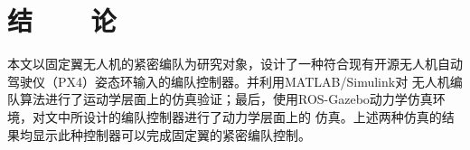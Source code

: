 %
%
%
%
%
%

\chapter*{\vskip 10bp\textmd{结~~~~论} \vskip -6bp}


本文以固定翼无人机的紧密编队为研究对象，设计了一种符合现有开源无人机自动驾驶仪（PX4）姿态环输入的编队控制器。并利用MATLAB/Simulink对
无人机编队算法进行了运动学层面上的仿真验证；最后，使用ROS-Gazebo动力学仿真环境，对文中所设计的编队控制器进行了动力学层面上的
仿真。上述两种仿真的结果均显示此种控制器可以完成固定翼的紧密编队控制。

